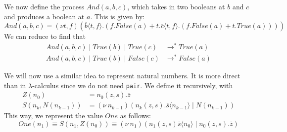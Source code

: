 \documentclass[a4paper, openany]{memoir}
\theoremstyle{definition}
\begin{document}
    We now define the process $\textit{And}(a, b, c)$, which takes in two booleans at $b$ and $c$ and produces a boolean at $a$. This is given by:
    \[\textit{And}(a, b, c) = (\nu t, f)(\overline{b} \langle t, f \rangle.(
        f.\textit{False}(a) + t.\overline{c} \langle t, f \rangle.(
            f.\textit{False}(a) + t.\textit{True}(a)
        )
    ))\]
    We can reduce to find that
    \begin{align*}
        \textit{And}(a, b, c) \mid \textit{True}(b) \mid \textit{True}(c) &\to^* \textit{True}(a) \\
        \textit{And}(a, b, c) \mid \textit{True}(b) \mid \textit{False}(c) &\to^* \textit{False}(a)
    \end{align*}

    We will now use a similar idea to represent natural numbers. It is more direct than in $\lambda$-calculus since we do not need \texttt{pair}. We define it recursively, with
    \begin{align*}
        Z(n_0) &= n_0(z, s).\overline{z} \\
        S(n_k, N(n_{k-1})) &= (\nu \ n_{k-1})(n_k(z, s).\overline{s} \langle n_{k-1} \rangle \mid N(n_{k-1}))
    \end{align*}
    This way, we represent the value $\textit{One}$ as follows:
    \[\textit{One}(n_1) \equiv S(n_1, Z(n_0)) \equiv (\nu \ n_1)(n_1(z, s) \overline{s} \langle n_0 \rangle \mid n_0(z, s).\overline{z})\]
    
\end{document}
